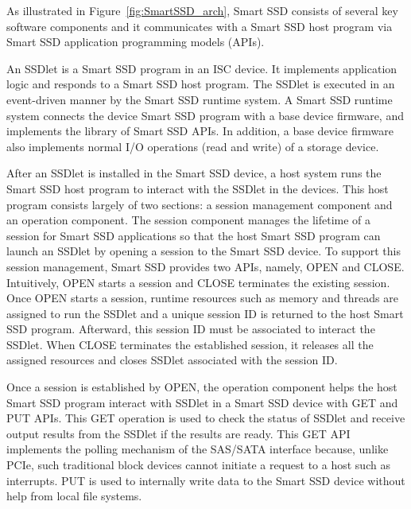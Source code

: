 As illustrated in Figure~\ref{fig:SmartSSD_arch}, Smart SSD consists of several key software components and it communicates with a Smart SSD host program via Smart SSD application programming models (APIs).


An SSDlet is a Smart SSD program in an ISC device. It implements application logic and responds to a Smart SSD host program. The SSDlet is executed in an event-driven manner by the Smart SSD runtime system. A Smart SSD runtime system connects the device Smart SSD program with a base device firmware, and implements the library of Smart SSD APIs. In addition, a base device firmware also implements normal I/O operations (read and write) of a storage device.

After an SSDlet is installed in the Smart SSD device, a host system runs the Smart SSD host program to interact with the SSDlet in the devices. This host program consists largely of two sections: a session management component and an operation component. The session component manages the lifetime of a session for Smart SSD applications so that the host Smart SSD program can launch an SSDlet by opening a session to the Smart SSD device. To support this session management, Smart SSD provides two APIs, namely, OPEN and CLOSE. Intuitively, OPEN starts a session and CLOSE terminates the existing session. Once OPEN starts a session, runtime resources such as memory and threads are assigned to run the SSDlet and a unique session ID is returned to the host Smart SSD program. Afterward, this session ID must be associated to interact the SSDlet. When CLOSE terminates the established session, it releases all the assigned resources and closes SSDlet associated with the session ID.

Once a session is established by OPEN, the operation component helps the host Smart SSD program interact with SSDlet in a Smart SSD device with GET and PUT APIs. This GET operation is used to check the status of SSDlet and receive output results from the SSDlet if the results are ready. This GET API implements the polling mechanism of the SAS/SATA interface because, unlike PCIe, such traditional block devices cannot initiate a request to a host such as interrupts. PUT is used to internally write data to the Smart SSD device without help from local file systems.



